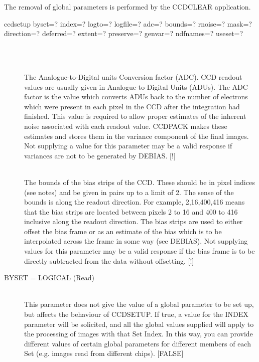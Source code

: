 \documentclass[twoside,11pt]{article}
\newcommand{\htmlref}[2]{#1}
\newcommand{\xlabel}[1]{}
\renewcommand{\_}{\texttt{\symbol{95}}}
\newcommand{\xroutine}[1]{\htmlref{{\sc #1}}{#1}}
\newcommand{\sstusage}[1]{\item[Usage:] \mbox{}
   \begin{description}
      {\ssttt \item #1}
   \end{description}
}
\newcommand{\sstparameters}[1]{
   \item[Parameters:] \mbox{} \\
   \vspace{-3.5ex}
   \begin{description}
      #1
   \end{description}
}
\newcommand{\sstsubsection}[1]{ \item[{#1}] \mbox{} \\}
\newcommand{\sstusage}[1]{\item[Usage:]
      \begin{description}
         {\ssttt #1}
      \end{description}
      \\
   }
\newcommand{\sstparameters}[1]{
      \item[Parameters:] \\
      \begin{description}
         #1
      \end{description}
      \\
   }
\newcommand{\sstsubsection}[1]{\item[{#1}]}
\begin{document}
{{      The removal of global parameters is performed by the \xroutine{CCDCLEAR}
      application.
   }
   \sstusage{
      ccdsetup byset=? index=? logto=? logfile=? adc=? bounds=? rnoise=? 
               mask=?  direction=? deferred=? extent=? preserve=? genvar=?
               ndfnames=? useset=?
   }
   \sstparameters{
      \sstsubsection{
         \xlabel{CCDADC}
         ADC = \_DOUBLE (Read and Write)
      } {
         The Analogue-to-Digital units Conversion factor (ADC). CCD
         readout values are usually given in Analogue-to-Digital Units
         (ADUs). The ADC factor is the value which converts ADUs back
         to the number of electrons which were present in each pixel in
         the CCD after the integration had finished. This value is
         required to allow proper estimates of the inherent noise
         associated with each readout value. CCDPACK makes these
         estimates and stores them in the variance component of the
         final images. Not supplying a value for this parameter may be a
         valid response if variances are not to be generated by \xroutine{DEBIAS}.
         [!]
      }
      \sstsubsection{
         \xlabel{CCDbounds}
         BOUNDS( 2 or 4 ) = \_INTEGER (Read and Write)
      } {
         The bounds of the bias strips of the CCD. These should be in
         pixel indices (see notes) and be given in pairs up to a limit
         of 2. The sense of the bounds is along the readout direction.
         For example, 2,16,400,416 means that the bias strips are
         located between pixels 2 to 16 and 400 to 416 inclusive along
         the readout direction. The bias strips are used to either
         offset the bias frame or as an estimate of the bias which is to
         be interpolated across the frame in some way (see \xroutine{DEBIAS}). Not
         supplying values for this parameter may be a valid response if
         the bias frame is to be directly subtracted from the data
         without offsetting.
         [!]
      }
      \sstsubsection{
         BYSET = \_LOGICAL (Read)
      } {
         This parameter does not give the value of a global parameter
         to be set up, but affects the behaviour of CCDSETUP.
         If true, a value for the INDEX parameter will be solicited, 
         and all the global values supplied will apply to 
         the processing of images with that Set Index.  In this way,
         you can provide different values of certain global parameters
         for different members of each Set (e.g. images read from
         different chips).
         [FALSE]
}}}
\end{document}
